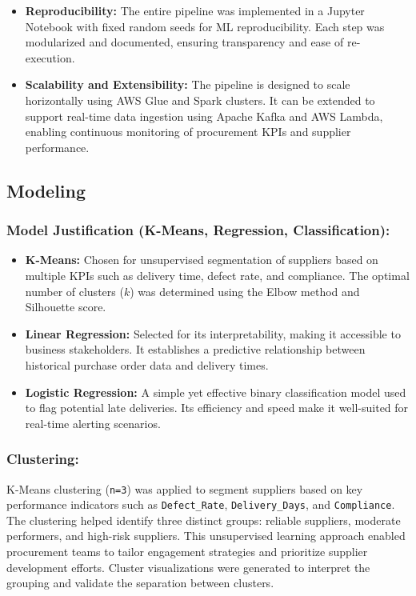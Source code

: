 \documentclass[10pt, twocolumn]{article}
\begin{document}
\begin{itemize}
    \item \textbf{Reproducibility:} The entire pipeline was implemented in a Jupyter Notebook with fixed random seeds for ML reproducibility. Each step was modularized and documented, ensuring transparency and ease of re-execution.

    \item \textbf{Scalability and Extensibility:} The pipeline is designed to scale horizontally using AWS Glue and Spark clusters. It can be extended to support real-time data ingestion using Apache Kafka and AWS Lambda, enabling continuous monitoring of procurement KPIs and supplier performance.
\end{itemize}


\subsection{Modeling}

\subsubsection{Model Justification (K-Means, Regression, Classification):} 
    \begin{itemize}
        \item \textbf{K-Means:} Chosen for unsupervised segmentation of suppliers based on multiple KPIs such as delivery time, defect rate, and compliance. The optimal number of clusters ($k$) was determined using the Elbow method and Silhouette score.
        
        \item \textbf{Linear Regression:} Selected for its interpretability, making it accessible to business stakeholders. It establishes a predictive relationship between historical purchase order data and delivery times.
        
        \item \textbf{Logistic Regression:} A simple yet effective binary classification model used to flag potential late deliveries. Its efficiency and speed make it well-suited for real-time alerting scenarios.
   \end{itemize}

\subsubsection{Clustering:} K-Means clustering (\texttt{n=3}) was applied to segment suppliers based on key performance indicators such as \texttt{Defect\_Rate}, \texttt{Delivery\_Days}, and \texttt{Compliance}. The clustering helped identify three distinct groups: reliable suppliers, moderate performers, and high-risk suppliers. This unsupervised learning approach enabled procurement teams to tailor engagement strategies and prioritize supplier development efforts. Cluster visualizations were generated to interpret the grouping and validate the separation between clusters.
\end{document}
